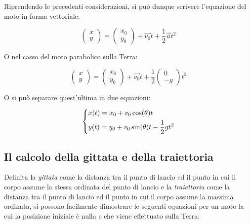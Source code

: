 \documentclass[oneside]{book}
\begin{document}
Riprendendo le precedenti considerazioni, si può dunque scrivere
l'equazione del moto in forma vettoriale:

\begin{equation}
    \begin{pmatrix}
        x \\
        y
    \end{pmatrix} = \begin{pmatrix}
        x_0 \\
        y_0
    \end{pmatrix} + \vec{v_0} t + \frac12 \vec{a} t^2
\end{equation}

O nel casso del moto parabolico sulla Terra:

\begin{equation}
    \begin{pmatrix}
        x \\
        y
    \end{pmatrix} = \begin{pmatrix}
        x_0 \\
        y_0
    \end{pmatrix} + \vec{v_0} t + \frac12 \begin{pmatrix}
        0 \\
        -g
    \end{pmatrix} t^2
\end{equation}

O si può separare quest'ultima in due equazioni:

\begin{equation}
    \begin{dcases}
        x(t)=x_0+v_0\cos(\theta)t \\
        y(t)=y_0+v_0\sin(\theta)t-\frac12gt^2
    \end{dcases}
\end{equation}

\subsection{Il calcolo della gittata e della traiettoria}

Definita la \textit{gittata} come la distanza tra il punto di lancio ed
il punto in cui il corpo assume la stessa ordinata del punto di lancio e
la \textit{traiettoria} come la distanza tra il punto di lancio ed il
punto in cui il corpo assume la massima ordinata, si possono facilmente
dimostrare le seguenti equazioni per un moto la cui la posizione iniziale
è nulla e che viene effettuato sulla Terra:
\end{document}
